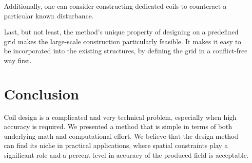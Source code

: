 Additionally, one can consider constructing dedicated coils to counteract a particular known disturbance.

Last, but not least, the method's unique property of designing on a predefined grid makes the large-scale construction particularly feasible. It makes it easy to be incorporated into the existing structures, by defining the grid in a conflict-free way first.



\section{Conclusion}
Coil design is a complicated and very technical problem, especially when high accuracy is required. We presented a method that is simple in terms of both underlying math and computational effort. We believe that the design method can find its niche in practical applications, where spatial constraints play a significant role and a percent level in accuracy of the produced field is acceptable.

